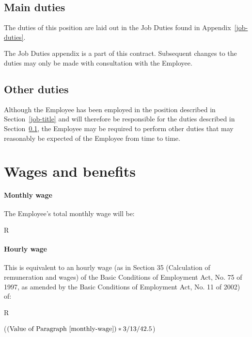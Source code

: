 \documentclass[a4paper,11pt]{article}
\begin{document}
\subsection{Main duties}
\label{main-duties}

\para The duties of this position are laid out in the Job Duties found in
Appendix~\ref{job-duties}.

\para The Job Duties appendix is a part of this contract. Subsequent changes to
the duties may only be made with consultation with the Employee.

\subsection{Other duties}
\label{other-duties}

\para Although the Employee has been employed in the position described in
Section~\ref{job-title} and will therefore be responsible for the duties
described in Section~\ref{main-duties}, the Employee may be required to perform
other duties that may reasonably be expected of the Employee from time to time.

\section{Wages and benefits}
\label{wages}

\paragraph{Monthly wage}\label{monthly-wage} The Employee's total monthly wage
will be:

\begin{center}
  R 
\end{center}

\paragraph{Hourly wage}\label{hourly-wage} This is equivalent to an hourly wage
(as in Section 35 (Calculation of remuneration and wages) of the Basic
Conditions of Employment Act, No. 75 of 1997, as amended by the Basic
Conditions of Employment Act, No. 11 of 2002) of:

\begin{center}
  R 

  (\((\text{Value of Paragraph~\ref{monthly-wage}}) * 3 / 13 / 42.5 \))
\end{center}
\end{document}
